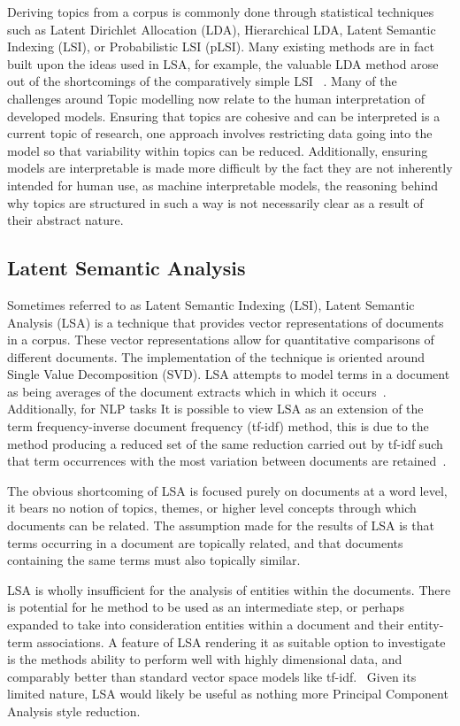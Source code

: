 \documentclass[10pt]{report}
\begin{document}
Deriving topics from a corpus is commonly done through statistical techniques such as Latent Dirichlet Allocation (LDA), Hierarchical LDA, Latent Semantic Indexing (LSI), or Probabilistic LSI (pLSI). Many existing methods are in fact built upon the ideas used in LSA, for example, the valuable LDA method arose out of the shortcomings of the comparatively simple LSI ~\cite{Blei2003-dj}. Many of the challenges around Topic modelling now relate to the human interpretation of developed models. Ensuring that topics are cohesive and can be interpreted is a current topic of research, one approach involves restricting data going into the model so that variability within topics can be reduced. Additionally, ensuring models are interpretable is made more difficult by the fact they are not inherently intended for human use, as machine interpretable models, the reasoning behind why topics are structured in such a way is not necessarily clear as a result of their abstract nature. 


\subsection{Latent Semantic Analysis}
Sometimes referred to as Latent Semantic Indexing (LSI), Latent Semantic Analysis (LSA) is a technique that provides vector representations of documents in a corpus. These vector representations allow for quantitative comparisons of different documents. The implementation of the technique is oriented around Single Value Decomposition (SVD). LSA attempts to model terms in a document as being averages of the document extracts which in which it occurs~\cite{Deerwester1989-yl}. Additionally, for NLP tasks It is possible to view LSA as an extension of the term frequency-inverse document frequency (tf-idf) method, this is due to the method producing a reduced set of the same reduction carried out by tf-idf such that term occurrences with the most variation between documents are retained~\cite{Landauer1998-kx}.

The obvious shortcoming of LSA is focused purely on documents at a word level, it bears no notion of topics, themes, or higher level concepts through which documents can be related. The assumption made for the results of LSA is that terms occurring in a document are topically related, and that documents containing the same terms must also topically similar.

LSA is wholly insufficient for the analysis of entities within the documents. There is potential for he method to be used as an intermediate step, or perhaps expanded to take into consideration entities within a document and their entity-term associations. A feature of LSA rendering it as suitable option to investigate is the methods ability to perform well with highly dimensional data, and comparably better than standard vector space models like tf-idf.~\cite{Kumar2004-da} Given its limited nature, LSA would likely be useful as nothing more Principal Component Analysis style reduction.
\end{document}
